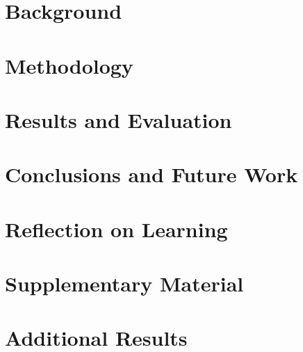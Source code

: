 \chapter{Background}\label{ch2}


\chapter{Methodology}\label{ch3}


\chapter{Results and Evaluation}\label{ch4}


\chapter{Conclusions and Future Work}\label{ch5}


\chapter{Reflection on Learning}\label{ch6}


\backmatter

\appendix
\chapter{Supplementary Material}\label{app:supp}


\chapter{Additional Results}\label{app:results}




